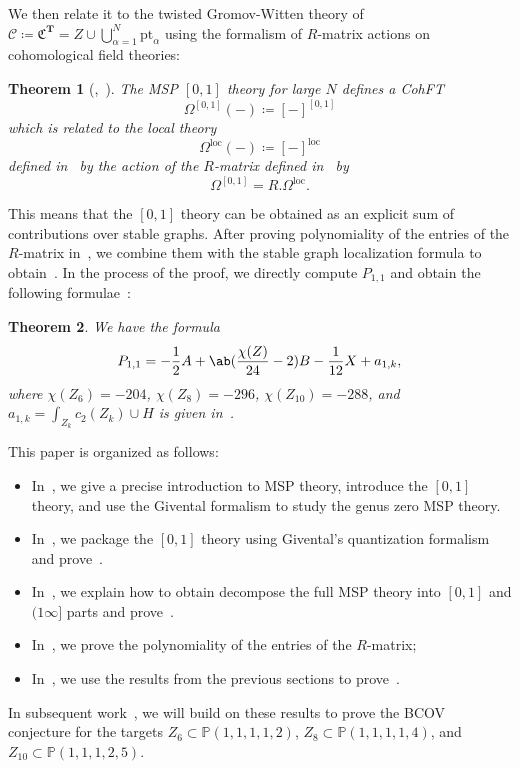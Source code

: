 \documentclass[10pt]{amsart}
\newtheorem{thm}{Theorem}[section]
\theoremstyle{definition}
\theoremstyle{remark}
\theoremstyle{plain}
\theoremstyle{definition}
\theoremstyle{remark}
\renewcommand{\P}{\mathbb{P}}
\newcommand{\mc}[1]{\mathcal{#1}}
\newcommand{\T}{\mathbf{T}}
\newcommand{\mf}[1]{\mathfrak{#1}}
\newcommand{\mr}[1]{\mathrm{#1}}
\newcommand{\1}{\mathbf{1}}
\newcommand{\2}{\mathbf{2}}
\newcommand{\3}{\mathbf{3}}
\newcommand{\pt}{\mr{pt}}
\newcommand{\loc}{\mr{loc}}
\numberwithin{equation}{section}
\begin{document}
We then relate it to the twisted Gromov-Witten theory of $\mc{C} \coloneqq \mf{C}^{\T} = Z \cup \bigcup_{\alpha=1}^N \pt_{\alpha}$ using the formalism of $R$-matrix actions on cohomological field theories:

\begin{thm}[,~]\label{thm:cohftintro}
    The MSP $[0,1]$ theory for large $N$ defines a CohFT 
    \[\Omega^{[0,1]}(-) \coloneqq [-]^{[0,1]} \] which is related to the local theory
    \[ \Omega^{\loc}(-) \coloneqq [-]^{\loc} \]
    defined in~
    by the action of the $R$-matrix defined in~ by
    \[ \Omega^{[0,1]} = R.\Omega^{\loc}. \]
\end{thm}

This means that the $[0,1]$ theory can be obtained as an explicit sum of contributions over stable graphs. After proving polynomiality of the entries of the $R$-matrix in~, we combine them with the stable graph localization formula to obtain~. In the process of the proof, we directly compute $P_{1,1}$ and obtain the following formulae~:

\begin{thm}
    We have the formula    
    \[
    P_{1,1} = -\frac{1}{2} A + \ab(\frac{\chi(Z)}{24} - 2)B - \frac{1}{12}X + a_{1,k}, 
    \]
    where $\chi(Z_6) = -204$, $\chi(Z_8) = -296$, $\chi(Z_{10}) = -288$, and $a_{1,k} = \int_{Z_k} c_2(Z_k) \cup H$ is given in~.
\end{thm}


This paper is organized as follows:
\begin{itemize}
    \item In~, we give a precise introduction to MSP theory, introduce the $[0,1]$ theory, and use the Givental formalism to study the genus zero MSP theory.
    \item In~, we package the $[0,1]$ theory using Givental's quantization formalism and prove~.
    \item In~, we explain how to obtain decompose the full MSP theory into $[0,1]$ and $(1\infty]$ parts and prove~.
    \item In~, we prove the polynomiality of the entries of the $R$-matrix;
    \item In~, we use the results from the previous sections to prove~.
\end{itemize}
In subsequent work~\cite{bcovme}, we will build on these results to prove the BCOV conjecture for the targets $Z_6 \subset \P(1,1,1,1,2)$, $Z_8 \subset \P(1,1,1,1,4)$, and $Z_{10} \subset \P(1,1,1,2,5)$.
\end{document}
